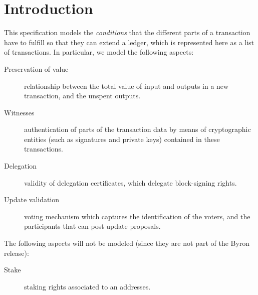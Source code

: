 \section{Introduction}
\label{sec:introduction}

This specification models the \textit{conditions} that the different parts of a
transaction have to fulfill so that they can extend a ledger, which is
represented here as a list of transactions. In particular, we model the
following aspects:

\begin{description}
\item[Preservation of value] relationship between the total value of input and
  outputs in a new transaction, and the unspent outputs.
\item[Witnesses] authentication of parts of the transaction data by means of
  cryptographic entities (such as signatures and private keys) contained in
  these transactions.
\item[Delegation] validity of delegation certificates, which delegate
  block-signing rights.
\item[Update validation] voting mechanism which captures the identification of
  the voters, and the participants that can post update proposals.
\end{description}

The following aspects will not be modeled (since they are not part of the Byron
release):
\begin{description}
\item[Stake] staking rights associated to an addresses.
\end{description}
